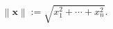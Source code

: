 \documentclass[10pt]{article} %
\begin{document}
\color{fgC}\[\left\|{\boldsymbol {x}}\right\|:={\sqrt {x_{1}^{2}+\cdots +x_{n}^{2}}}.\]
\end{document}
